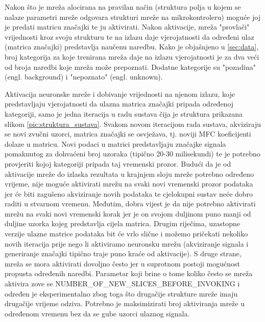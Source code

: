 Nakon što je mreža alocirana na pravilan način (struktura polja u kojem se nalaze parametri
mreže odgovara strukturi mreže na mikrokontroleru) moguće joj je predati matricu značajki
te ju aktivirati. Nakon aktivacije, mreža "provlači" vrijednosti kroz svoju strukturu te na
izlazu daje vjerojatnosti da određeni ulaz (matrica značajki) predstavlja naučenu naredbu. 
Kako je objašnjeno u \ref{sec:data}, broj kategorija za koje trenirana mreža daje na izlazu
vjerojatnosti je za dva veći od broja naredbi koje mreža može prepoznati. Dodatne kategorije
su "pozadina" (engl. background) i "nepoznato" (engl. unknown). 

Aktivacija neuronske mreže i dobivanje vrijednosti na njenom izlazu, koje predstavljaju
vjerojatnosti da ulazna matrica značajki pripada određenoj kategoriji, samo je jedna iteracija 
u radu sustava čija je struktura prikazana slikom \ref{pic:struktura_sustava}. Svakom novom 
iteracijom rada sustava, akviziraju se novi zvučni uzorci, matrica značajki se osvježava, 
tj. noviji MFC koeficijenti dolaze u matricu. Novi podaci u matrici predstavljaju značajke 
signala pomaknutog za dohvaćeni broj uzoraka (tipično 20-30 milisekundi) te je potrebno provjeriti
kojoj kategoriji pripada taj vremenski prozor. Budući da je od aktivacije mreže do izlaska 
rezultata u krajnjem sloju mreže potrebno određeno vrijeme, nije moguće aktivirati mrežu 
na svaki novi vremenski prozor podataka jer će biti zagušeno akviziranje novih podataka
te cjelokupni sustav neće dobro raditi u stvarnom vremenu. Međutim, dobra vijest je da
nije potrebno aktivirati mrežu na svaki novi vremenski korak jer je on svojom duljinom
puno manji od duljine uzorka kojeg predstavlja cijela matrica. Drugim riječima, uzastopne
verzije ulazne matrice podataka bit će vrlo slične i možemo pričekati nekoliko novih
iteracija prije nego li aktiviramo neuronsku mrežu (akviziranje signala i generiranje značajki
tipično traje puno kraće od aktivacije). S druge strane, mreža se mora aktivirati dovoljno
često jer u suprotnom postoji mogućnost propusta određenih naredbi. Parametar koji brine o tome 
koliko često se mreža aktivira zove se NUMBER\_OF\_NEW\_SLICES\_BEFORE\_INVOKING i određen
je eksperimentalno zbog toga što drugačije strukture mreže imaju drugačije vrijeme odziva.
Potrebno je maksimizirati broj aktiviranja mreže u određenom vremenu bez da se gube
uzorci ulaznog signala.

